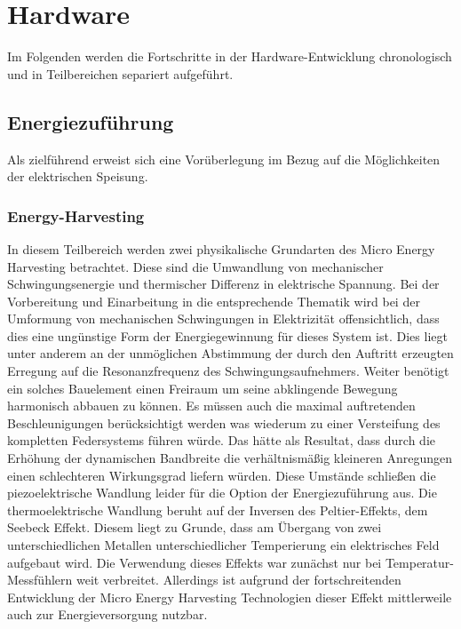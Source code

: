 \documentclass[11pt]{scrreprt} %
\begin{document}
\chapter{Hardware}
Im Folgenden werden die Fortschritte in der Hardware-Entwicklung chronologisch und in Teilbereichen separiert aufgeführt.
\section{Energiezuführung}
Als zielführend erweist sich eine Vorüberlegung im Bezug auf die Möglichkeiten der elektrischen Speisung.
\subsection{Energy-Harvesting}
In diesem Teilbereich werden zwei physikalische Grundarten des Micro Energy Harvesting betrachtet. Diese sind die Umwandlung von mechanischer Schwingungsenergie und thermischer Differenz in elektrische Spannung. Bei der Vorbereitung und Einarbeitung in die entsprechende Thematik wird bei der Umformung von mechanischen Schwingungen in Elektrizität offensichtlich, dass dies eine ungünstige Form der Energiegewinnung für dieses System ist. Dies liegt unter anderem an der unmöglichen Abstimmung der durch den Auftritt erzeugten Erregung auf die Resonanzfrequenz des Schwingungsaufnehmers. Weiter benötigt ein solches Bauelement einen Freiraum um seine abklingende Bewegung harmonisch abbauen zu können. Es müssen auch die maximal auftretenden Beschleunigungen berücksichtigt werden was wiederum zu einer Versteifung des kompletten Federsystems führen würde. Das hätte als Resultat, dass durch die Erhöhung der dynamischen Bandbreite die verhältnismäßig kleineren Anregungen einen schlechteren Wirkungsgrad liefern würden. Diese Umstände schließen die piezoelektrische Wandlung leider für die Option der Energiezuführung aus. \citep[vgl. S.39]{Dembowski2011} \newline 
Die thermoelektrische Wandlung beruht auf der Inversen des Peltier-Effekts, dem Seebeck Effekt. Diesem liegt zu Grunde, dass am Übergang von zwei unterschiedlichen Metallen unterschiedlicher Temperierung ein elektrisches Feld aufgebaut wird. Die Verwendung dieses Effekts war zunächst nur bei Temperatur-Messfühlern weit verbreitet. Allerdings ist aufgrund der fortschreitenden Entwicklung der Micro Energy Harvesting Technologien dieser Effekt mittlerweile auch zur Energieversorgung nutzbar. \newline \newline
\end{document}
